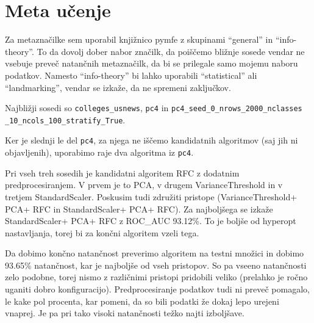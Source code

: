 \documentclass{article}
\begin{document}
\section{Meta učenje}
Za metaznačilke sem uporabil knjižnico pymfe z skupinami ``general'' in ``info-theory''. To da dovolj dober nabor značilk, da poiščemo bližnje sosede vendar ne vsebuje preveč natančnih metaznačilk, da bi se prilegale samo mojemu naboru podatkov. Namesto ``info-theory'' bi lahko uporabili ``statistical'' ali ``landmarking'', vendar se izkaže, da ne spremeni zaključkov.

Najbližji sosedi so \verb|colleges_usnews|, \verb|pc4| in \texttt{pc4\_seed\_0\_nrows\_2000\_nclasses} \texttt{\_10\_ncols\_100\_stratify\_True}.

Ker je slednji le del \verb|pc4|, za njega ne iščemo kandidatnih algoritmov (saj jih ni objavljenih), uporabimo raje dva algoritma iz \verb|pc4|.

Pri vseh treh sosedih je kandidatni algoritem RFC z dodatnim predprocesiranjem. V prvem je to PCA, v drugem VarianceThreshold in v tretjem StandardScaler. Poskusim tudi združiti pristope (VarianceThreshold+ PCA+ RFC in StandardScaler+ PCA+ RFC). Za najboljšega se izkaže StandardScaler+ PCA+ RFC z ROC\_AUC 93.12\%. To je boljše od hyperopt nastavljanja, torej bi za končni algoritem vzeli tega.

Da dobimo končno natančnost preverimo algoritem na testni množici in dobimo 93.65\% natančnost, kar je najboljše od vseh pristopov. So pa vseeno natančnosti zelo podobne, torej nismo z različnimi pristopi pridobili veliko (prelahko je ročno uganiti dobro konfiguracijo). Predprocesiranje podatkov tudi ni preveč pomagalo, le kake pol procenta, kar pomeni, da so bili podatki že dokaj lepo urejeni vnaprej. Je pa pri tako visoki natančnosti težko najti izboljšave.
\end{document}
